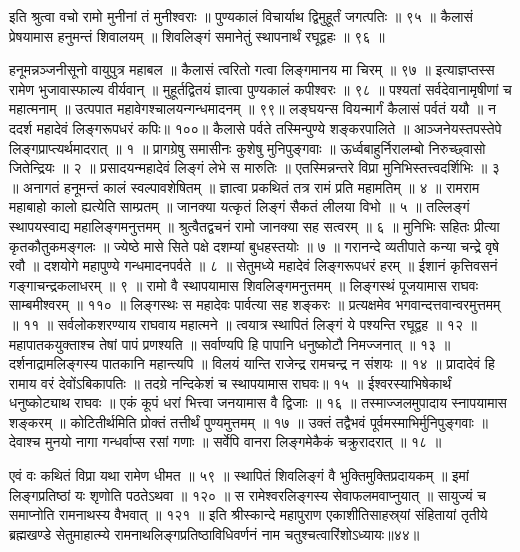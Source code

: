 इति श्रुत्वा वचो रामो मुनीनां तं मुनीश्वराः ॥
पुण्यकालं विचार्याथ द्विमुहूर्तं जगत्पतिः ॥ ९५ ॥
कैलासं प्रेषयामास हनुमन्तं शिवालयम् ॥
शिवलिङ्गं समानेतुं स्थापनार्थं रघूद्वहः ॥ ९६ ॥

हनूमन्नञ्जनीसूनो वायुपुत्र महाबल ॥
कैलासं त्वरितो गत्वा लिङ्गमानय मा चिरम् ॥ ९७ ॥
इत्याज्ञप्तस्स रामेण भुजावास्फाल्य वीर्यवान् ॥
मुहूर्तद्वितयं ज्ञात्वा पुण्यकालं कपीश्वरः ॥ ९८ ॥
पश्यतां सर्वदेवानामृषीणां च महात्मनाम् ॥
उत्पपात महावेगश्चालयन्गन्धमादनम् ॥ ९९॥
लङ्घयन्स वियन्मार्गं कैलासं पर्वतं ययौ ॥
न ददर्श महादेवं लिङ्गरूपधरं कपिः॥ १००॥
कैलासे पर्वते तस्मिन्पुण्ये शङ्करपालिते ॥
आञ्जनेयस्तपस्तेपे लिङ्गप्राप्त्यर्थमादरात् ॥ १ ॥
प्रागग्रेषु समासीनः कुशेषु मुनिपुङ्गवाः ॥
ऊर्ध्वबाहुर्निरालम्बो निरुच्छ्वासो जितेन्द्रियः ॥ २ ॥
प्रसादयन्महादेवं लिङ्गं लेभे स मारुतिः ॥
एतस्मिन्नन्तरे विप्रा मुनिभिस्तत्त्वदर्शिभिः ॥ ३ ॥
अनागतं हनूमन्तं कालं स्वल्पावशेषितम् ॥
ज्ञात्वा प्रकथितं तत्र रामं प्रति महामतिम् ॥ ४ ॥
रामराम महाबाहो कालो ह्यत्येति साम्प्रतम् ॥
जानक्या यत्कृतं लिङ्गं सैकतं लीलया विभो ॥ ५ ॥
तल्लिङ्गं स्थापयस्वाद्य महालिङ्गमनुत्तमम् ॥
श्रुत्वैतद्वचनं रामो जानक्या सह सत्वरम् ॥ ६ ॥
मुनिभिः सहितः प्रीत्या कृतकौतुकमङ्गलः ॥
ज्येष्ठे मासे सिते पक्षे दशम्यां बुधहस्तयोः ॥ ७ ॥
गरानन्दे व्यतीपाते कन्या चन्द्रे वृषे रवौ ॥
दशयोगे महापुण्ये गन्धमादनपर्वते ॥ ८ ॥
सेतुमध्ये महादेवं लिङ्गरूपधरं हरम् ॥
ईशानं कृत्तिवसनं गङ्गाचन्द्रकलाधरम् ॥ ९ ॥
रामो वै स्थापयामास शिवलिङ्गमनुत्तमम् ॥
लिङ्गस्थं पूजयामास राघवः साम्बमीश्वरम् ॥ ११० ॥
लिङ्गस्थः स महादेवः पार्वत्या सह शङ्करः ॥
प्रत्यक्षमेव भगवान्दत्तवान्वरमुत्तमम् ॥ ११ ॥
सर्वलोकशरण्याय राघवाय महात्मने ॥
त्वयात्र स्थापितं लिङ्गं ये पश्यन्ति रघूद्वह ॥ १२ ॥
महापातकयुक्ताश्च तेषां पापं प्रणश्यति ॥
सर्वाण्यपि हि पापानि धनुष्कोटौ निमज्जनात् ॥ १३ ॥
दर्शनाद्रामलिङ्गस्य पातकानि महान्त्यपि ॥
विलयं यान्ति राजेन्द्र रामचन्द्र न संशयः ॥ १४ ॥
प्रादादेवं हि रामाय वरं देवोंऽबिकापतिः ॥
तदग्रे नन्दिकेशं च स्थापयामास राघवः॥ १५ ॥
ईश्वरस्याभिषेकार्थं धनुष्कोट्याथ राघवः ॥
एकं कूपं धरां भित्त्वा जनयामास वै द्विजाः ॥ १६ ॥
तस्माज्जलमुपादाय स्नापयामास शङ्करम् ॥
कोटितीर्थमिति प्रोक्तं तत्तीर्थं पुण्यमुत्तमम् ॥ १७ ॥
उक्तं तद्वैभवं पूर्वमस्माभिर्मुनिपुङ्गवाः ॥
देवाश्च मुनयो नागा गन्धर्वाप्स रसां गणाः ॥
सर्वेपि वानरा लिङ्गमेकैकं चक्रुरादरात् ॥ १८ ॥

एवं वः कथितं विप्रा यथा रामेण धीमत ॥ ५९ ॥
स्थापितं शिवलिङ्गं वै भुक्तिमुक्तिप्रदायकम् ॥
इमां लिङ्गप्रतिष्ठां यः शृणोति पठतेऽथवा ॥ १२० ॥
स रामेश्वरलिङ्गस्य सेवाफलमवाप्नुयात् ॥
सायुज्यं च समाप्नोति रामनाथस्य वैभवात् ॥ १२१ ॥
इति श्रीस्कान्दे महापुराण एकाशीतिसाहस्र्यां संहितायां तृतीये ब्रह्मखण्डे सेतुमाहात्म्ये रामनाथलिङ्गप्रतिष्ठाविधिवर्णनं नाम चतुश्चत्वारिंशोऽध्यायः॥४४॥


